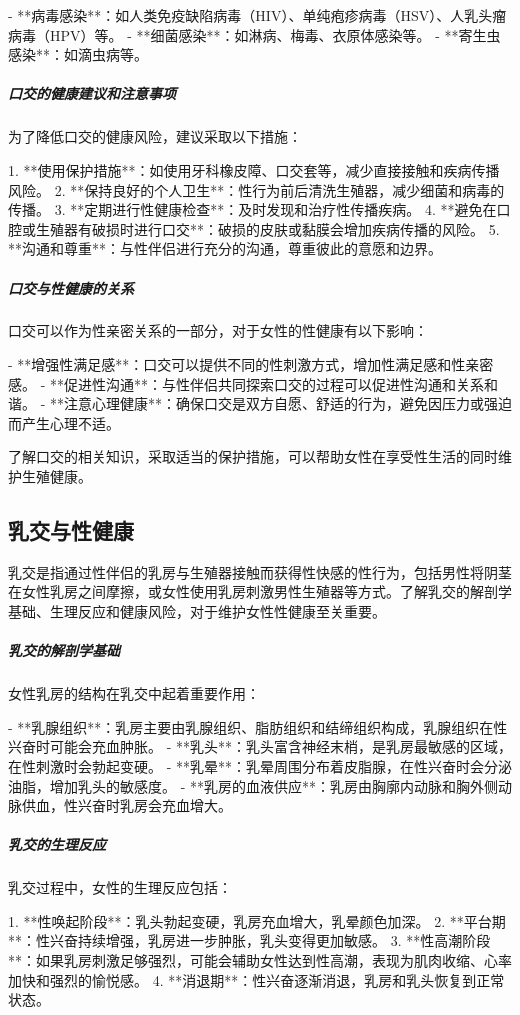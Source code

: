 \begin{enumerate}
- **病毒感染**：如人类免疫缺陷病毒（HIV）、单纯疱疹病毒（HSV）、人乳头瘤病毒（HPV）等。
- **细菌感染**：如淋病、梅毒、衣原体感染等。
- **寄生虫感染**：如滴虫病等。

\subparagraph{口交的健康建议和注意事项}

为了降低口交的健康风险，建议采取以下措施：

1. **使用保护措施**：如使用牙科橡皮障、口交套等，减少直接接触和疾病传播风险。
2. **保持良好的个人卫生**：性行为前后清洗生殖器，减少细菌和病毒的传播。
3. **定期进行性健康检查**：及时发现和治疗性传播疾病。
4. **避免在口腔或生殖器有破损时进行口交**：破损的皮肤或黏膜会增加疾病传播的风险。
5. **沟通和尊重**：与性伴侣进行充分的沟通，尊重彼此的意愿和边界。

\subparagraph{口交与性健康的关系}

口交可以作为性亲密关系的一部分，对于女性的性健康有以下影响：

- **增强性满足感**：口交可以提供不同的性刺激方式，增加性满足感和性亲密感。
- **促进性沟通**：与性伴侣共同探索口交的过程可以促进性沟通和关系和谐。
- **注意心理健康**：确保口交是双方自愿、舒适的行为，避免因压力或强迫而产生心理不适。

了解口交的相关知识，采取适当的保护措施，可以帮助女性在享受性生活的同时维护生殖健康。

\subsection{乳交与性健康}

乳交是指通过性伴侣的乳房与生殖器接触而获得性快感的性行为，包括男性将阴茎在女性乳房之间摩擦，或女性使用乳房刺激男性生殖器等方式。了解乳交的解剖学基础、生理反应和健康风险，对于维护女性性健康至关重要。

\subparagraph{乳交的解剖学基础}

女性乳房的结构在乳交中起着重要作用：

- **乳腺组织**：乳房主要由乳腺组织、脂肪组织和结缔组织构成，乳腺组织在性兴奋时可能会充血肿胀。
- **乳头**：乳头富含神经末梢，是乳房最敏感的区域，在性刺激时会勃起变硬。
- **乳晕**：乳晕周围分布着皮脂腺，在性兴奋时会分泌油脂，增加乳头的敏感度。
- **乳房的血液供应**：乳房由胸廓内动脉和胸外侧动脉供血，性兴奋时乳房会充血增大。

\subparagraph{乳交的生理反应}

乳交过程中，女性的生理反应包括：

1. **性唤起阶段**：乳头勃起变硬，乳房充血增大，乳晕颜色加深。
2. **平台期**：性兴奋持续增强，乳房进一步肿胀，乳头变得更加敏感。
3. **性高潮阶段**：如果乳房刺激足够强烈，可能会辅助女性达到性高潮，表现为肌肉收缩、心率加快和强烈的愉悦感。
4. **消退期**：性兴奋逐渐消退，乳房和乳头恢复到正常状态。


\end{enumerate}
